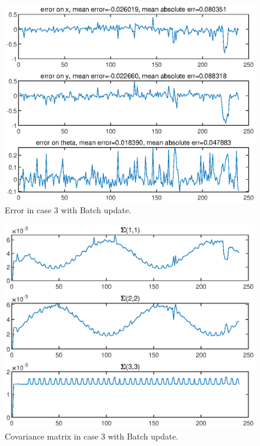 \documentclass[11pt,a4paper]{article}
\begin{document}
\begin{itemize}
		\begin{figure}[H]
			\centering
			\includegraphics[width=0.9\columnwidth]{Figure/Case_3_Figure_2_Batch.eps}
			\caption{Error in case 3 with Batch update.}
			\label{fig:Case_3_Figure_2_Batch}
		\end{figure}

		\begin{figure}[H]
			\centering
			\includegraphics[width=\columnwidth]{Figure/Case_3_Figure_3_Batch.eps}
			\caption{Covariance matrix in case 3 with Batch update.}
			\label{fig:Case_3_Figure_3_Batch}
		\end{figure}
\end{itemize}
\end{document}

